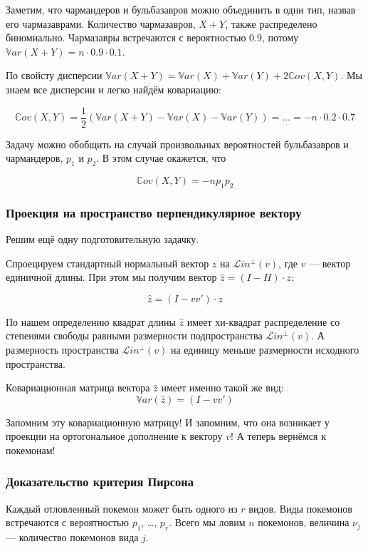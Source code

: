 \documentclass[11pt,russian,]{article}
\newcommand{\1}{\mathbbm{1}}
\newcommand{\Lin}{\mathcal{L}in}
\newcommand{\Linp}{\Lin^{\perp}}
\newcommand{\Var}{\mathbb{V}ar}
\newcommand{\Cov}{\mathbb{C}ov}
\begin{document}
Заметим, что чармандеров и бульбазавров можно объединить в одни тип,
назвав его чармазаврами. Количество чармазавров, \(X+Y\), также
распределено биномиально. Чармазавры встречаются с вероятностью \(0.9\),
потому \(\Var(X+Y)=n\cdot 0.9 \cdot 0.1\).

По свойсту дисперсии \(\Var(X+Y)=\Var(X) + \Var(Y) + 2\Cov(X, Y)\). Мы
знаем все дисперсии и легко найдём ковариацию:

\[
\Cov(X, Y) = \frac{1}{2}(\Var(X+Y) - \Var(X) - \Var(Y))= \ldots = -n\cdot 0.2 \cdot 0.7
\]

Задачу можно обобщить на случай произвольных вероятностей бульбазавров и
чармандеров, \(p_1\) и \(p_2\). В этом случае окажется, что

\[
\Cov(X, Y) = -n p_1 p_2
\]

\subsubsection{Проекция на пространство перпендикулярное
вектору}\label{----}

Решим ещё одну подготовительную задачку.

Спроецируем стандартный нормальный вектор \(z\) на \(\Linp(v)\), где
\(v\) --- вектор единичной длины. При этом мы получим вектор
\(\hat z = (I - H) \cdot z\):

\[
\hat z = (I - vv')\cdot z
\]

По нашем определению квадрат длины \(\hat z\) имеет хи-квадрат
распределение со степенями свободы равными размерности подпространства
\(\Linp(v)\). А размерность пространства \(\Linp(v)\) на единицу меньше
размерности исходного пространства.

Ковариационная матрица вектора \(\hat z\) имеет именно такой же вид: \[
\Var(\hat z) = (I - vv')
\]

Запомним эту ковариационную матрицу! И запомним, что она возникает у
проекции на ортогональное дополнение к вектору \(v\)! А теперь вернёмся
к покемонам!

\subsubsection{Доказательство критерия Пирсона}\label{--}

Каждый отловленный покемон может быть одного из \(r\) видов. Виды
покемонов встречаются с вероятностью \(p_1\), \ldots, \(p_{r}\). Всего
мы ловим \(n\) покемонов, величина \(\nu_j\) --- количество покемонов
вида \(j\).
\end{document}
